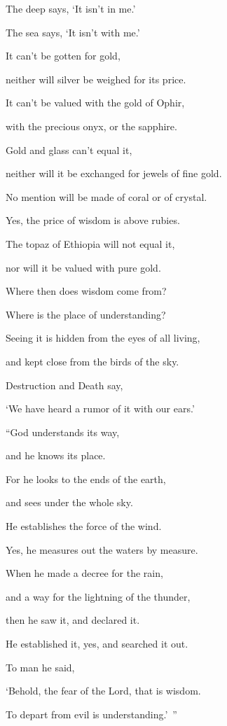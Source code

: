 {\par }{\Q {}The deep says, ‘It isn’t in me.’
\par }{\QB The sea says, ‘It isn’t with me.’
\par }{\Q {}It can’t be gotten for gold,
\par }{\QB neither will silver be weighed for its price.
\par }{\Q {}It can’t be valued with the gold of Ophir,
\par }{\QB with the precious onyx, or the sapphire.
\par }{\Q {}Gold and glass can’t equal it,
\par }{\QB neither will it be exchanged for jewels of fine gold.
\par }{\Q {}No mention will be made of coral or of crystal.
\par }{\QB Yes, the price of wisdom is above rubies.
\par }{\Q {}The topaz of Ethiopia will not equal it,
\par }{\QB nor will it be valued with pure gold.
\par }{\Q {}Where then does wisdom come from?
\par }{\QB Where is the place of understanding?
\par }{\Q {}Seeing it is hidden from the eyes of all living,
\par }{\QB and kept close from the birds of the sky.
\par }{\Q {}Destruction and Death say,
\par }{\QB ‘We have heard a rumor of it with our ears.’
\par }{\BB \par }{\Q {}“God understands its way,
\par }{\QB and he knows its place.
\par }{\Q {}For he looks to the ends of the earth,
\par }{\QB and sees under the whole sky.
\par }{\Q {}He establishes the force of the wind.
\par }{\QB Yes, he measures out the waters by measure.
\par }{\Q {}When he made a decree for the rain,
\par }{\QB and a way for the lightning of the thunder,
\par }{\Q {}then he saw it, and declared it.
\par }{\QB He established it, yes, and searched it out.
\par }{\Q {}To man he said,
\par }{\QB ‘Behold, the fear of the Lord, that is wisdom.
\par }{\QB To depart from evil is understanding.’ ”
\par }{\BB \par }
